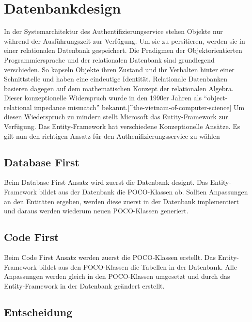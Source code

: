 \newpage

\section{Datenbankdesign}\label{datenbankdesign}

In der Systemarchitektur des Authentifizierungservice stehen Objekte nur
während der Ausführungszeit zur Verfügung. Um sie zu persitieren, werden
sie in einer relationalen Datenbank gespeichert. Die Pradigmen der
Objektorientierten Programmiersprache und der relationalen Datenbank
sind grundlegend verschieden. So kapseln Objekte ihren Zustand und ihr
Verhalten hinter einer Schnittstelle und haben eine eindeutige
Identität. Relationale Datenbanken basieren dagegen auf dem
mathematischen Konzept der relationalen Algebra. Dieser konzeptionelle
Widerspruch wurde in den 1990er Jahren als ``object-relational impedance
mismatch'' bekannt.{[}\^{}the-vietnam-of-computer-science{]} Um diesen
Wiederspruch zu mindern stellt Microsoft das Entity-Framework zur
Verfügung. Das Entity-Framework hat verschiedene Konzeptionelle Ansätze.
Es gilt nun den richtigen Ansatz für den Authenifizierungsservice zu
wählen

\subsection{Database First}\label{database-first}

Beim Database First Ansatz wird zuerst die Datenbank designt. Das
Entity-Framework bildet aus der Datenbank die POCO-Klassen ab. Sollten
Anpassungen an den Entitäten ergeben, werden diese zuerst in der
Datenbank implementiert und daraus werden wiederum neuen POCO-Klassen
generiert.

\subsection{Code First}\label{code-first}

Beim Code First Ansatz werden zuerst die POCO-Klassen erstellt. Das
Entity-Framework bildet aus den POCO-Klassen die Tabellen in der
Datenbank. Alle Anpassungen werden gleich in den POCO-Klassen umgesetzt
und durch das Entity-Framework in der Datenbank geändert erstellt.

\subsection{Entscheidung}\label{entscheidung}

